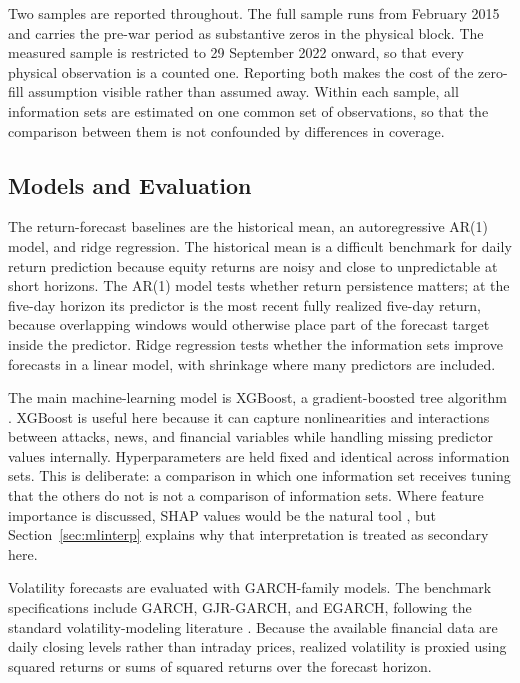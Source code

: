 \documentclass[12pt,a4paper]{article}
\begin{document}
Two samples are reported throughout. The full sample runs from February 2015 and carries the pre-war period as substantive zeros in the physical block. The measured sample is restricted to 29 September 2022 onward, so that every physical observation is a counted one. Reporting both makes the cost of the zero-fill assumption visible rather than assumed away. Within each sample, all information sets are estimated on one common set of observations, so that the comparison between them is not confounded by differences in coverage.

\subsection{Models and Evaluation}

The return-forecast baselines are the historical mean, an autoregressive AR(1) model, and ridge regression. The historical mean is a difficult benchmark for daily return prediction because equity returns are noisy and close to unpredictable at short horizons. The AR(1) model tests whether return persistence matters; at the five-day horizon its predictor is the most recent fully realized five-day return, because overlapping windows would otherwise place part of the forecast target inside the predictor. Ridge regression tests whether the information sets improve forecasts in a linear model, with shrinkage where many predictors are included.

The main machine-learning model is XGBoost, a gradient-boosted tree algorithm \citep{chen2016xgboost}. XGBoost is useful here because it can capture nonlinearities and interactions between attacks, news, and financial variables while handling missing predictor values internally. Hyperparameters are held fixed and identical across information sets. This is deliberate: a comparison in which one information set receives tuning that the others do not is not a comparison of information sets. Where feature importance is discussed, SHAP values would be the natural tool \citep{lundberg2017shap}, but Section~\ref{sec:mlinterp} explains why that interpretation is treated as secondary here.

Volatility forecasts are evaluated with GARCH-family models. The benchmark specifications include GARCH, GJR-GARCH, and EGARCH, following the standard volatility-modeling literature \citep{bollerslev1986garch,glosten1993gjr,nelson1991egarch}. Because the available financial data are daily closing levels rather than intraday prices, realized volatility is proxied using squared returns or sums of squared returns over the forecast horizon.
\end{document}
